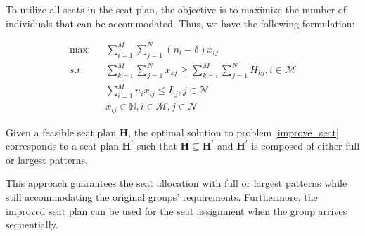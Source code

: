 To utilize all seats in the seat plan, the objective is to maximize the number of individuals that can be accommodated. Thus, we have the following formulation:

\begin{equation}\label{improve_seat}
  \begin{aligned}
  \max \quad & \sum_{i=1}^{M} \sum_{j=1}^{N} (n_i-\delta)  x_{ij} \\
  s.t. \quad & \sum_{k=i}^{M} \sum_{j=1}^{N}  x_{kj} \geq  \sum_{k=i}^{M} \sum_{j=1}^{N} H_{kj}, i \in \mathcal{M} \\
  & \sum_{i=1}^{M} n_{i} x_{ij} \leq L_{j}, j \in \mathcal{N} \\
  & x_{ij} \in \mathbb{N}, i \in \mathcal{M}, j \in \mathcal{N}
  \end{aligned}
\end{equation}

\begin{prop}\label{prop_construction}
Given a feasible seat plan $\bm{H}$, the optimal solution to problem \eqref{improve_seat} corresponds to a seat plan $\bm{H}^{\prime}$ such that $\bm{H} \subseteq \bm{H}^{\prime}$ and $\bm{H}^{\prime}$ is composed of either full or largest patterns.
\end{prop}


This approach guarantees the seat allocation with full or largest patterns while still accommodating the original groups' requirements. Furthermore, the improved seat plan can be used for the seat assignment when the group arrives sequentially.

